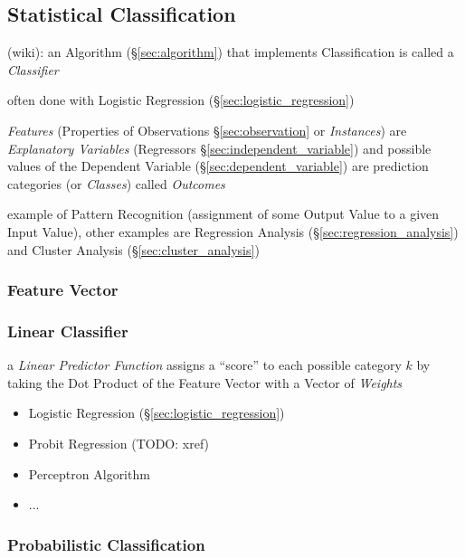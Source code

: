 \subsection{Statistical Classification}\label{sec:statistical_classification}

(wiki): an Algorithm (\S\ref{sec:algorithm}) that implements Classification is
called a \emph{Classifier}

often done with Logistic Regression (\S\ref{sec:logistic_regression})

\emph{Features} (Properties of Observations \S\ref{sec:observation} or
\emph{Instances}) are \emph{Explanatory Variables} (Regressors
\S\ref{sec:independent_variable}) and possible values of the Dependent Variable
(\S\ref{sec:dependent_variable}) are prediction categories (or \emph{Classes})
called \emph{Outcomes}

example of Pattern Recognition (assignment of some Output Value to a given Input
Value), other examples are Regression Analysis (\S\ref{sec:regression_analysis})
and Cluster Analysis (\S\ref{sec:cluster_analysis})



\subsubsection{Feature Vector}\label{sec:feature_vector}

\subsubsection{Linear Classifier}\label{sec:linear_classifier}

a \emph{Linear Predictor Function} assigns a ``score'' to each possible category
$k$ by taking the Dot Product of the Feature Vector with a Vector of
\emph{Weights}

\begin{itemize}
\item Logistic Regression (\S\ref{sec:logistic_regression})
\item Probit Regression (TODO: xref)
\item Perceptron Algorithm
\item ...
\end{itemize}



\subsubsection{Probabilistic Classification}
\label{sec:probabilistic_classification}

